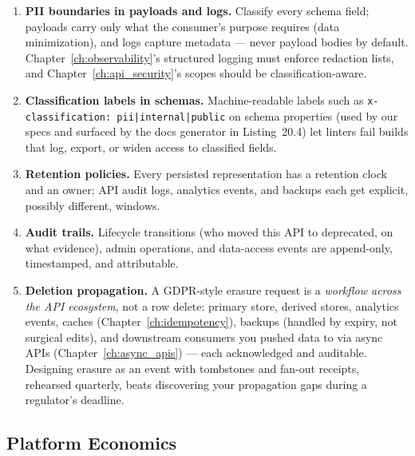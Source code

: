 \begin{enumerate}
  \item \textbf{PII boundaries in payloads and logs.} Classify every
        schema field; payloads carry only what the consumer's purpose
        requires (data minimization), and logs capture metadata ---
        never payload bodies by default. Chapter~\ref{ch:observability}'s
        structured logging must enforce redaction lists, and
        Chapter~\ref{ch:api_security}'s scopes should be
        classification-aware.
  \item \textbf{Classification labels in schemas.} Machine-readable
        labels such as \texttt{x-classification: pii|internal|public} on
        schema properties (used by our specs and surfaced by the docs
        generator in Listing~20.4) let linters fail builds that
        log, export, or widen access to classified fields.
  \item \textbf{Retention policies.} Every persisted representation has a
        retention clock and an owner; API audit logs, analytics events,
        and backups each get explicit, possibly different, windows.
  \item \textbf{Audit trails.} Lifecycle transitions (who moved this API
        to \textsf{deprecated}, on what evidence), admin operations, and
        data-access events are append-only, timestamped, and attributable.
  \item \textbf{Deletion propagation.} A GDPR-style erasure request is a
        \emph{workflow across the API ecosystem}, not a row delete:
        primary store, derived stores, analytics events, caches
        (Chapter~\ref{ch:idempotency}), backups (handled by expiry, not
        surgical edits), and downstream consumers you pushed data to via
        async APIs (Chapter~\ref{ch:async_apis}) --- each acknowledged and
        auditable. Designing erasure as an event with tombstones and
        fan-out receipts, rehearsed quarterly, beats discovering your
        propagation gaps during a regulator's deadline.
\end{enumerate}

\subsection{Platform Economics}
\label{sec:ch20-economics}

